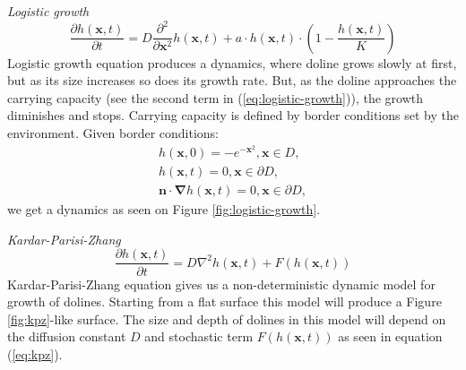 \documentclass[a0,portrait]{a0poster}
\begin{document}
\begin{multicols}{2}
\vspace{5mm}
\textit{Logistic growth}
\begin{equation}
  \frac{ \partial h(\mathbf{x},t) }{ \partial t} = D \frac{\partial^2}{\partial \mathbf{x}^2} h(\mathbf{x},t) + a \cdot h(\mathbf{x},t) \cdot (1 - \frac{h(\mathbf{x},t)}{K})
  \label{eq:logistic-growth}
\end{equation}
Logistic growth equation produces a dynamics, where doline grows slowly at first, but as its size increases so does its growth rate. But, as the doline approaches the carrying capacity (see the second term in (\ref{eq:logistic-growth})), the growth diminishes and stops. Carrying capacity is defined by border conditions set by the environment.
Given border conditions:
\begin{equation}
  \begin{aligned}
    h(\mathbf{x},0) =  - e^{-\mathbf{x}^2}, \mathbf{x} \in D, \\
    h(\mathbf{x},t) = 0, \mathbf{x} \in \partial D, \\
    \mathbf{n} \cdot \boldsymbol \nabla h(\mathbf{x},t) = 0, \mathbf{x} \in \partial D,
  \end{aligned}
\end{equation}
we get a dynamics as seen on Figure \ref{fig:logistic-growth}.

\vspace{5mm}
\textit{Kardar-Parisi-Zhang}
\begin{equation} \frac{ \partial h(\mathbf{x},t)}{ \partial t} = D \nabla^2 h(\mathbf{x},t) + F(h(\mathbf{x},t)) \label{eq:kpz} \end{equation}
Kardar-Parisi-Zhang equation gives us a non-deterministic dynamic model for growth of dolines. Starting from a flat surface this model will produce a Figure \ref{fig:kpz}-like surface. The size and depth of dolines in this model will depend on the diffusion constant $D$ and stochastic term $F(h(\mathbf{x},t))$ as seen in equation (\ref{eq:kpz}).


\end{multicols}
\end{document}
